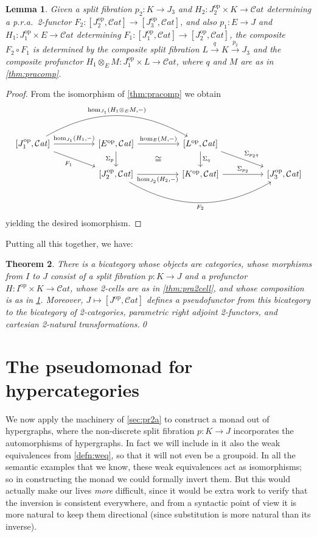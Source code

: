 \documentclass{article}
\newtheorem{thm}{Theorem}[section]
\newtheorem{lem}[thm]{Lemma}
\theoremstyle{definition}
\theoremstyle{remark}
\def\Cat{\ensuremath{\mathcal{C}\mathit{at}}}
\def\op{^{\mathrm{op}}}
\let\xto\xrightarrow
\begin{document}
\begin{lem}\label{thm:pracomp2}
  Given a split fibration $p_2:K\to J_3$ and $H_2:J_2\op \times K\to \Cat$ determining a p.r.a.\ 2-functor $F_2:[J_2\op,\Cat] \to [J_3\op,\Cat]$, and also $p_1:E\to J$ and $H_1:J_1\op \times E\to \Cat$ determining $F_1 : [J_1\op,\Cat] \to [J_2\op,\Cat]$, the composite $F_2\circ F_1$ is determined by the composite split fibration $L \xto{q} K \xto{p_2} J_3$ and the composite profunctor $H_1 \otimes_E M : J_1\op \times L \to \Cat$, where $q$ and $M$ are as in \cref{thm:pracomp}.
\end{lem}
\begin{proof}
  From the isomorphism of \cref{thm:pracomp} we obtain
  \[
  \begin{tikzcd}[column sep=huge]
    {[J_1\op,\Cat]} \ar[r,"{\hom_{J_1}(H_1,-)}"] \ar[dr,"F_1"'] \ar[rr,"{\hom_{J_1}(H_1 \otimes_E M,-)}",bend left] &
    {[E\op,\Cat]} \ar[r,"{\hom_E(M,-)}"] \ar[d,"\Sigma_p"'] \ar[dr,phantom,"\cong"] & {[L\op,\Cat]} \ar[d,"\Sigma_q"]
    \ar[dr,"\Sigma_{p_2 q}"] \\
    &{[J_2\op,\Cat]} \ar[r,"{\hom_{J_2}(H_2,-)}"'] \ar[rr,"F_2"',bend right]
    & {[K\op,\Cat]}
    \ar[r,"\Sigma_{p_2}"] & {[J_3\op,\Cat]}
  \end{tikzcd}
  \]
  yielding the desired isomorphism.
\end{proof}

Putting all this together, we have:

\begin{thm}\label{thm:pra-psfr}
  There is a bicategory whose objects are categories, whose morphisms from $I$ to $J$ consist of a split fibration $p:K\to J$ and a profunctor $H:I\op\times K\to \Cat$, whose 2-cells are as in \cref{thm:pra2cell}, and whose composition is as in \cref{thm:pracomp2}.
  Moreover, $J\mapsto [J\op,\Cat]$ defines a pseudofunctor from this bicategory to the bicategory of 2-categories, parametric right adjoint 2-functors, and cartesian 2-natural transformations.\qed
\end{thm}


\section{The pseudomonad for hypercategories}
\label{sec:hypercats}

We now apply the machinery of \cref{sec:pr2a} to construct a monad out of hypergraphs, where the non-discrete split fibration $p:K\to J$ incorporates the automorphisms of hypergraphs.
In fact we will include in it also the weak equivalences from \cref{defn:weq}, so that it will not even be a groupoid.
In all the semantic examples that we know, these weak equivalences act as isomorphisms; so in constructing the monad we could formally invert them.
But this would actually make our lives \emph{more} difficult, since it would be extra work to verify that the inversion is consistent everywhere, and from a syntactic point of view it is more natural to keep them directional (since substitution is more natural than its inverse).
\end{document}
